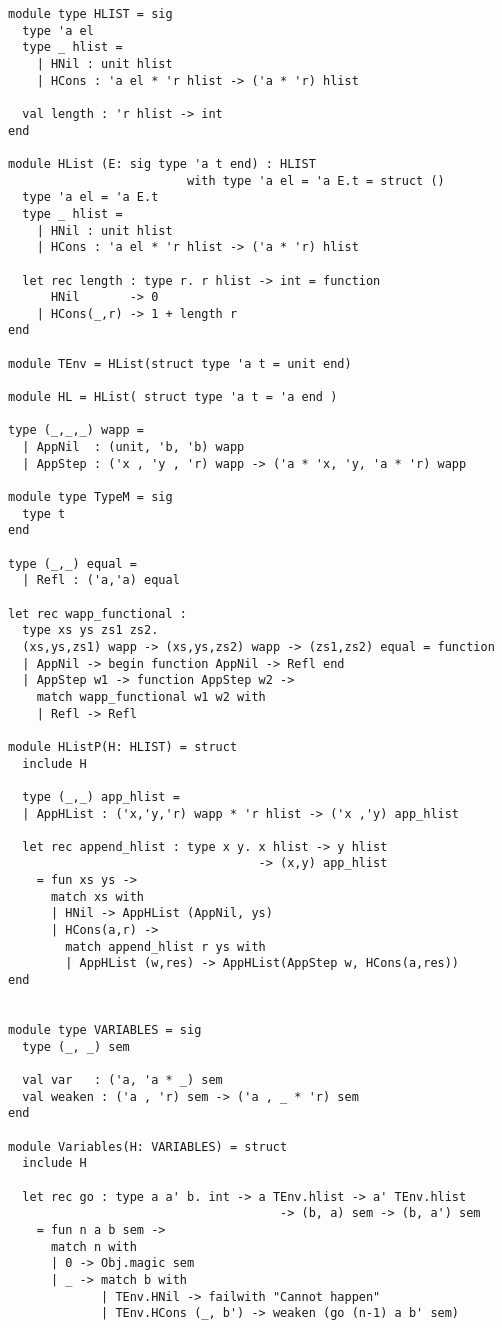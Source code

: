 \documentclass[uplatex]{sumiilab-paper}
\theoremstyle{mystyle}
\numberwithin{definition}{chapter} %
\begin{document}
\begin{lstlisting}[caption=OCaml版EbUの実装,label=src:unembedding_ocaml]
module type HLIST = sig 
  type 'a el
  type _ hlist = 
    | HNil : unit hlist 
    | HCons : 'a el * 'r hlist -> ('a * 'r) hlist

  val length : 'r hlist -> int 
end 

module HList (E: sig type 'a t end) : HLIST
                         with type 'a el = 'a E.t = struct ()
  type 'a el = 'a E.t 
  type _ hlist = 
    | HNil : unit hlist 
    | HCons : 'a el * 'r hlist -> ('a * 'r) hlist 

  let rec length : type r. r hlist -> int = function
      HNil       -> 0 
    | HCons(_,r) -> 1 + length r 
end

module TEnv = HList(struct type 'a t = unit end)

module HL = HList( struct type 'a t = 'a end )

type (_,_,_) wapp =
  | AppNil  : (unit, 'b, 'b) wapp
  | AppStep : ('x , 'y , 'r) wapp -> ('a * 'x, 'y, 'a * 'r) wapp

module type TypeM = sig 
  type t 
end 

type (_,_) equal =
  | Refl : ('a,'a) equal 

let rec wapp_functional : 
  type xs ys zs1 zs2. 
  (xs,ys,zs1) wapp -> (xs,ys,zs2) wapp -> (zs1,zs2) equal = function
  | AppNil -> begin function AppNil -> Refl end  
  | AppStep w1 -> function AppStep w2 -> 
    match wapp_functional w1 w2 with  
    | Refl -> Refl 

module HListP(H: HLIST) = struct
  include H

  type (_,_) app_hlist =
  | AppHList : ('x,'y,'r) wapp * 'r hlist -> ('x ,'y) app_hlist  
       
  let rec append_hlist : type x y. x hlist -> y hlist 
                                   -> (x,y) app_hlist 
    = fun xs ys -> 
      match xs with
      | HNil -> AppHList (AppNil, ys)
      | HCons(a,r) -> 
        match append_hlist r ys with 
        | AppHList (w,res) -> AppHList(AppStep w, HCons(a,res))
end


module type VARIABLES = sig
  type (_, _) sem

  val var   : ('a, 'a * _) sem  
  val weaken : ('a , 'r) sem -> ('a , _ * 'r) sem
end

module Variables(H: VARIABLES) = struct
  include H

  let rec go : type a a' b. int -> a TEnv.hlist -> a' TEnv.hlist 
                                      -> (b, a) sem -> (b, a') sem 
    = fun n a b sem ->
      match n with
      | 0 -> Obj.magic sem
      | _ -> match b with 
             | TEnv.HNil -> failwith "Cannot happen"
             | TEnv.HCons (_, b') -> weaken (go (n-1) a b' sem)


\end{lstlisting}
\end{document}
